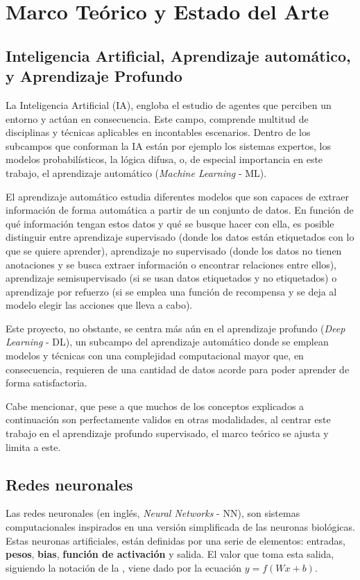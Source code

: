 \section{Marco Teórico y Estado del Arte}

\subsection{Inteligencia Artificial, Aprendizaje automático, y Aprendizaje Profundo}
La Inteligencia Artificial (IA), engloba el estudio de agentes que perciben un entorno y actúan en consecuencia. Este campo, comprende multitud de disciplinas y técnicas aplicables en incontables escenarios. Dentro de los subcampos que conforman la IA están por ejemplo los sistemas expertos, los modelos probabilísticos, la lógica difusa, o, de especial importancia en este trabajo, el aprendizaje automático (\textit{Machine Learning} - ML). 

El aprendizaje automático estudia diferentes modelos que son capaces de extraer información de forma automática a partir de un conjunto de datos. En función de qué información tengan estos datos y qué se busque hacer con ella, es posible distinguir entre aprendizaje supervisado (donde los datos están etiquetados con lo que se quiere aprender), aprendizaje no supervisado (donde los datos no tienen anotaciones y se busca extraer información o encontrar relaciones entre ellos), aprendizaje semisupervisado (si se usan datos etiquetados y no etiquetados) o aprendizaje por refuerzo (si se emplea una función de recompensa y se deja al modelo elegir las acciones que lleva a cabo).

Este proyecto, no obstante, se centra más aún en el aprendizaje profundo (\textit{Deep Learning} - DL), un subcampo del aprendizaje automático donde se emplean modelos y técnicas con una complejidad computacional mayor que, en consecuencia, requieren de una cantidad de datos acorde para poder aprender de forma satisfactoria.

Cabe mencionar, que pese a que muchos de los conceptos explicados a continuación son perfectamente validos en otras modalidades, al centrar este trabajo en el aprendizaje profundo supervisado, el marco teórico se ajusta y limita a este. 

\subsection{Redes neuronales}
Las redes neuronales (en inglés, \textit{Neural Networks} - NN), son sistemas computacionales inspirados en una versión simplificada de las neuronas biológicas. Estas neuronas artificiales, están definidas por una serie de elementos: entradas, \textbf{pesos}, \textbf{bias}, \textbf{función de activación} y salida. El valor que toma esta salida, siguiendo la notación de la , viene dado por la ecuación $y = f(Wx + b)$.

